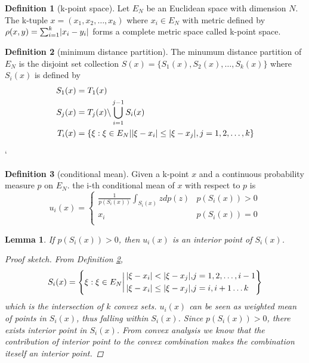 \documentclass{article}
\newtheorem{lemma}{Lemma}
\theoremstyle{definition}
\newtheorem{definition}{Definition}
\DeclarePairedDelimiter\abs{\lvert}{\rvert}
\begin{document}
\begin{definition}[k-point space]
Let $E_N$ be an Euclidean space with dimension $N$. The k-tuple $x=(x_1, x_2, \dots, x_k)$ where $x_i \in E_N$ with metric defined by $\rho(x,y) = \sum_{i=1}^k \abs{x_i-y_i}$ forms a complete metric space called k-point space.
\end{definition}
\begin{definition}[minimum distance partition]\label{def:mdp}
The minumum distance partition of $E_N$ is the disjoint set collection $S(x) = \{S_1(x),S_2(x),\dots, S_k(x)\}$ where $S_i(x) $ is defined by
\begin{subequations}
\begin{align}
S_1(x)  & = T_1(x)  \\
S_j(x) & = T_j(x)\backslash \bigcup_{i=1}^{j-1} S_i(x) \\
T_i(x) & = \{ \xi: \xi \in E_N | \abs{\xi-x_i} \leq \abs{\xi-x_j}, j=1,2,\dots,k\}
\end{align}
\end{subequations}
\end{definition}`
\begin{definition}[conditional mean]
Given a k-point $x$ and a continuous probability measure $p$ on $E_N$.  the i-th conditional mean of $x$ with respect to $p$ is
\begin{equation}
u_i(x)=\begin{cases}
\frac{1}{p(S_i(x))} \int_{S_i(x)} z dp(z)  & p(S_i(x))>0 \\
x_i & p(S_i(x))=0 \\
\end{cases}
\end{equation}
\end{definition}
\begin{lemma}\label{lem:ip}
If $p(S_i(x))>0$, then $u_i(x)$ is an interior point of $S_i(x)$.
\begin{proof}[Proof sketch]
From Definition \ref{def:mdp}, 
$$
S_i(x) =\left\{ \xi: \xi \in E_N \bigg| \,\begin{aligned} \abs{\xi-x_i} < \abs{\xi-x_j}, &  j=1,2,\dots, i-1\\
 \abs{\xi-x_i} \leq \abs{\xi - x_j}, & j=i,  i+1 \dots k \end{aligned}
\right\}
$$
which is the intersection of $k$ convex sets. $u_i(x)$ can be seen as weighted mean of points in $S_i(x)$, thus falling within $S_i(x)$. Since $p(S_i(x))>0$, there exists interior point in $S_i(x)$. From convex analysis we know that the contribution of interior point to the convex combination makes the combination iteself an interior point.
\end{proof}
\end{lemma}
\end{document}
